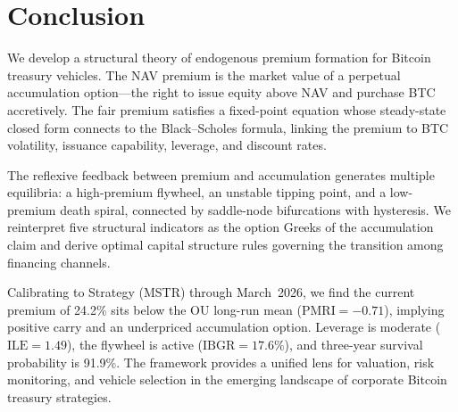 
\section{Conclusion}\label{sec:conclusion}

We develop a structural theory of endogenous premium formation for Bitcoin
treasury vehicles.  The NAV premium is the market value of a perpetual
accumulation option---the right to issue equity above NAV and purchase BTC
accretively.  The fair premium satisfies a fixed-point equation whose
steady-state closed form connects to the Black--Scholes formula, linking
the premium to BTC volatility, issuance capability, leverage, and discount
rates.

The reflexive feedback between premium and accumulation generates multiple
equilibria: a high-premium flywheel, an unstable tipping point, and a
low-premium death spiral, connected by saddle-node bifurcations with
hysteresis.  We reinterpret five structural indicators as the option Greeks
of the accumulation claim and derive optimal capital structure rules
governing the transition among financing channels.

Calibrating to Strategy (MSTR) through March~2026, we find the current
premium of 24.2\% sits below the OU long-run mean ($\text{PMRI} = -0.71$),
implying positive carry and an underpriced accumulation option.  Leverage is
moderate ($\mathrm{ILE} = 1.49$), the flywheel is active
($\mathrm{IBGR} = 17.6\%$), and three-year survival probability is 91.9\%.
The framework provides a unified lens for valuation, risk monitoring, and
vehicle selection in the emerging landscape of corporate Bitcoin treasury
strategies.
